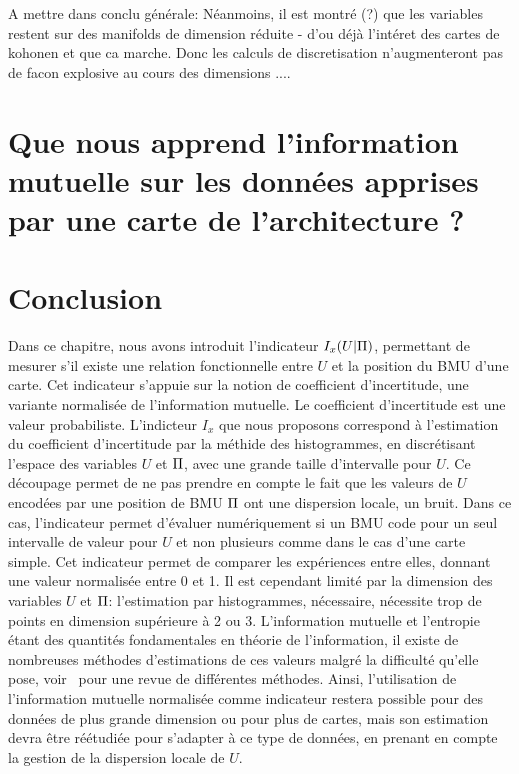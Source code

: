 \documentclass[../main]{subfiles}
\begin{document}
A mettre dans conclu générale: 
Néanmoins, il est montré (?) que  les variables restent sur des manifolds de dimension réduite - d'ou déjà l'intéret des cartes de kohonen et que ca marche. Donc les calculs de discretisation n'augmenteront pas de facon explosive au cours des dimensions ....



\section{Que nous apprend l'information mutuelle sur les données apprises par une carte de l'architecture ?}


\section{Conclusion}

Dans ce chapitre, nous avons introduit l'indicateur $I_x(U|\Pi)$, permettant de mesurer s'il existe une relation fonctionnelle entre $U$ et la position du BMU d'une carte. Cet indicateur s'appuie sur la notion de coefficient d'incertitude, une variante normalisée de l'information mutuelle. Le coefficient d'incertitude est une valeur probabiliste. L'indicteur $I_x$ que nous proposons correspond à l'estimation du coefficient d'incertitude par la méthide des histogrammes, en discrétisant l'espace des variables $U$ et $\Pi$, avec une grande taille d'intervalle pour $U$. Ce découpage permet de ne pas prendre en compte le fait que les valeurs de $U$ encodées par une position de BMU $\Pi$ ont une dispersion locale, un bruit. Dans ce cas, l'indicateur permet d'évaluer numériquement si un BMU code pour un seul intervalle de valeur pour $U$ et non plusieurs comme dans le cas d'une carte simple.
Cet indicateur permet de comparer les expériences entre elles, donnant une valeur normalisée entre 0 et 1.
Il est cependant limité par la dimension des variables $U$ et $\Pi$: l'estimation par histogrammes, nécessaire, nécessite trop de points en dimension supérieure à 2 ou 3.
L'information mutuelle et l'entropie étant des quantités fondamentales en théorie de l'information, il existe de nombreuses méthodes d'estimations de ces valeurs malgré la difficulté qu'elle pose, voir~\cite{Doquire2012ACO} pour une revue de différentes méthodes. 
Ainsi, l'utilisation de l'information mutuelle normalisée comme indicateur restera possible pour des données de plus grande dimension ou pour plus de cartes, mais son estimation devra être réétudiée pour s'adapter à ce type de données, en prenant en compte la gestion de la dispersion locale de $U$.
\end{document}
